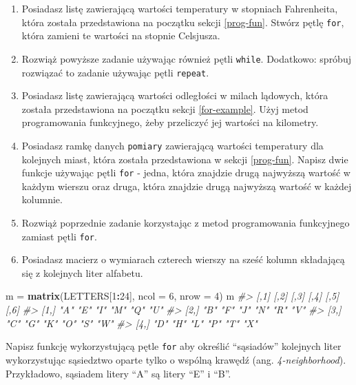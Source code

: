 \documentclass[paper=6in:9in,pagesize=pdftex,headinclude=on,footinclude=on,10pt]{scrbook}
\newenvironment{Shaded}{\begin{snugshade}}{\end{snugshade}}
\newcommand{\CommentTok}[1]{\textcolor[rgb]{0.56,0.35,0.01}{\textit{#1}}}
\newcommand{\DataTypeTok}[1]{\textcolor[rgb]{0.13,0.29,0.53}{#1}}
\newcommand{\DecValTok}[1]{\textcolor[rgb]{0.00,0.00,0.81}{#1}}
\newcommand{\KeywordTok}[1]{\textcolor[rgb]{0.13,0.29,0.53}{\textbf{#1}}}
\newcommand{\NormalTok}[1]{#1}
\newcommand{\OperatorTok}[1]{\textcolor[rgb]{0.81,0.36,0.00}{\textbf{#1}}}
\newcommand{\StringTok}[1]{\textcolor[rgb]{0.31,0.60,0.02}{#1}}
\begin{document}
\begin{enumerate}
\def\labelenumi{\arabic{enumi})}
\setcounter{enumi}{5}
\item
  Posiadasz listę zawierającą wartości temperatury w stopniach Fahrenheita, która została przedstawiona na początku sekcji \ref{prog-fun}.
  Stwórz pętlę \texttt{for}, która zamieni te wartości na stopnie Celsjusza.
\item
  Rozwiąż powyższe zadanie używając również pętli \texttt{while}.
  Dodatkowo: spróbuj rozwiązać to zadanie używając pętli \texttt{repeat}.
\item
  Posiadasz listę zawierającą wartości odległości w milach lądowych, która została przedstawiona na początku sekcji \ref{for-example}.
  Użyj metod programowania funkcyjnego, żeby przeliczyć jej wartości na kilometry.
\item
  Posiadasz ramkę danych \texttt{pomiary} zawierającą wartości temperatury dla kolejnych miast, która została przedstawiona w sekcji \ref{prog-fun}.
  Napisz dwie funkcje używając pętli \texttt{for} - jedna, która znajdzie drugą najwyższą wartość w każdym wierszu oraz druga, która znajdzie drugą najwyższą wartość w każdej kolumnie.
\item
  Rozwiąż poprzednie zadanie korzystając z metod programowania funkcyjnego zamiast pętli \texttt{for}.
\item
  Posiadasz macierz o wymiarach czterech wierszy na sześć kolumn składającą się z kolejnych liter alfabetu.
\end{enumerate}

\begin{Shaded}
\begin{Highlighting}[]
\NormalTok{m =}\StringTok{ }\KeywordTok{matrix}\NormalTok{(LETTERS[}\DecValTok{1}\OperatorTok{:}\DecValTok{24}\NormalTok{], }\DataTypeTok{ncol =} \DecValTok{6}\NormalTok{, }\DataTypeTok{nrow =} \DecValTok{4}\NormalTok{)}
\NormalTok{m}
\CommentTok{#>      [,1] [,2] [,3] [,4] [,5] [,6]}
\CommentTok{#> [1,] "A"  "E"  "I"  "M"  "Q"  "U" }
\CommentTok{#> [2,] "B"  "F"  "J"  "N"  "R"  "V" }
\CommentTok{#> [3,] "C"  "G"  "K"  "O"  "S"  "W" }
\CommentTok{#> [4,] "D"  "H"  "L"  "P"  "T"  "X"}
\end{Highlighting}
\end{Shaded}

Napisz funkcję wykorzystującą pętle \texttt{for} aby określić ``sąsiadów'' kolejnych liter wykorzystując sąsiedztwo oparte tylko o wspólną krawędź (ang. \emph{4-neighborhood}).
Przykładowo, sąsiadem litery ``A'' są litery ``E'' i ``B''.
\end{document}
